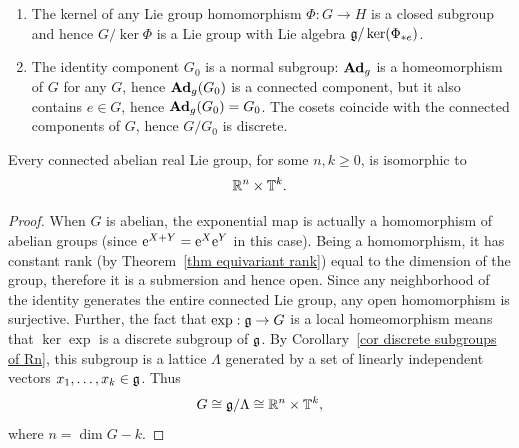 \begin{example}\label{example kernel subgroup}
    \begin{enumerate}
        \item The kernel of any Lie group homomorphism $\Phi:G\to H$ is a closed subgroup and hence $G\slash \ker\Phi$ is a Lie group with Lie algebra $\mathfrak{g}\slash\ker(\Phi_{\ast e})$.
        \item The identity component $G_0$ is a normal subgroup: $\mathrm{\mathbf{Ad}}_g$ is a homeomorphism of $G$ for any $G$, hence $\mathrm{\mathbf{Ad}}_g(G_0)$ is a connected component, but it also contains $e\in G$, hence $\mathrm{\mathbf{Ad}}_g(G_0)=G_0$. The cosets coincide with the connected components of $G$, hence $G\slash G_0$ is discrete.
    \end{enumerate}
\end{example}



\begin{cor}
    Every connected abelian real Lie group,  for some $n,k\geq 0$, is isomorphic to
    \[\mathbb{R}^n\times \mathbb{T}^k.\]
\end{cor}
\begin{proof}
    When $G$ is abelian, the exponential map is actually a homomorphism of abelian groups (since $\mathrm{e}^{X+Y}=\mathrm{e}^X\mathrm{e}^Y$ in this case). Being a homomorphism, it has constant rank (by Theorem~\ref{thm equivariant rank}) equal to the dimension of the group, therefore it is a submersion and hence open. Since any neighborhood of the identity generates the entire connected Lie group, any open homomorphism is surjective. Further, the fact that $\exp:\mathfrak{g}\to G$ is a local homeomorphism means that $\ker\exp $ is a discrete subgroup of $\mathfrak{g}$. By Corollary~\ref{cor discrete subgroups of Rn}, this subgroup is a lattice $\Lambda$ generated by a set of linearly independent vectors $x_1,\ldots,x_k\in\mathfrak{g}$. Thus
    \[G\cong \mathfrak{g}\slash \Lambda\cong \mathbb{R}^n\times \mathbb{T}^k,\]
    where $n=\dim G-k$.
\end{proof}


